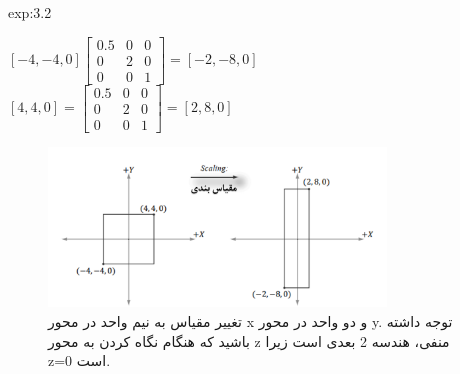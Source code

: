 {\begin{spacing}{1.5}
\begin{example}{exp:3.2}
            \begin{center}
                $[-4,-4,0]\begin{bmatrix}
                              0.5 & 0 & 0 \\
                              0   & 2 & 0 \\
                              0   & 0 & 1
                \end{bmatrix}=[-2,-8,0]$\\$[4,4,0]=\begin{bmatrix}
                                                       0.5 & 0 & 0 \\
                                                       0   & 2 & 0 \\
                                                       0   & 0 & 1
                \end{bmatrix}=[2,8,0]$
            \end{center}
            \begin{figure}[H]
                \centering
                \setlength{\belowcaptionskip}{-10pt}
                \includegraphics[width=0.8\textwidth]{Images/4/3/4.Session.1.3.2}
                \caption {تغییر مقیاس به نیم واحد در محور x و دو واحد در محور y. توجه داشته باشید که هنگام نگاه کردن به محور z منفی، هندسه 2 بعدی است زیرا z=0 است. \textbf{\vspace{12pt}}}
                \label{fig:4.Session.1.3.2}
            \end{figure}
        \end{example}
    \end{spacing}
}

